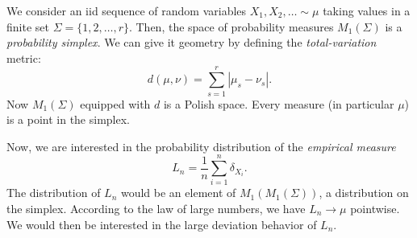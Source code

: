 
We consider an iid sequence of random variables $X_1, X_2, \ldots \sim \mu$ taking values in a finite set $\Sigma = \{1,2,\ldots,r\} $. Then, the space of probability measures $M_1(\Sigma)$ is a \textit{probability simplex}.
We can give it geometry by defining the \textit{total-variation} metric:
\[
	d(\mu, \nu) = \sum_{s=1}^{r} |\mu_s - \nu_s|
.\] 
Now $M_1(\Sigma)$ equipped with $d$ is a Polish space. Every measure (in particular $\mu$) is a point in the simplex.

Now, we are interested in the probability distribution of the  \textit{empirical measure}
\[
	L_n = \frac{1}{n} \sum_{i=1}^{n} \delta_{X_i}
.\] 
The distribution of $L_n$ would be an element of $M_1(M_1(\Sigma))$, a distribution on the simplex. According to the law of large numbers, we have $L_n \to \mu$ pointwise. We would then be interested in the large deviation behavior of $L_n$.

